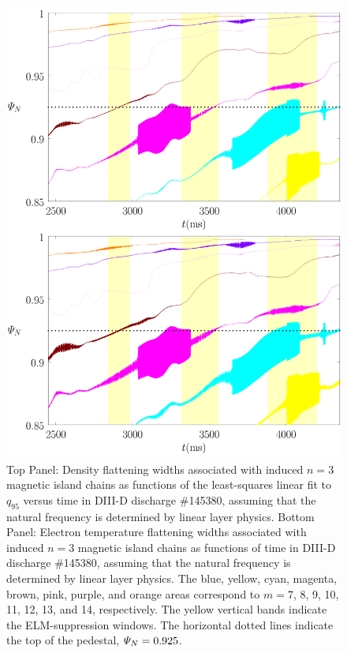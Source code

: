 \documentclass[12pt,prb,aps]{revtex4-1}
\begin{document}
\begin{figure}
\includegraphics[height=6in]{fig13.pdf}
\caption{Top Panel: Density flattening widths associated with induced $n=3$ magnetic island  chains as functions of the least-squares linear fit to $q_{95}$ versus time
in   DIII-D discharge \#145380, assuming that the natural frequency is determined by linear layer physics.
Bottom Panel:  Electron temperature flattening widths associated with induced $n=3$ magnetic island chains as functions of time
in   DIII-D discharge \#145380, assuming that the natural frequency is determined by linear layer physics. The blue, yellow, cyan, magenta, brown, pink,
purple, and orange  areas correspond to $m=7$, 8, 9, 10, 11, 12, 13, and 14, respectively. The yellow vertical bands indicate the ELM-suppression windows. 
The horizontal dotted lines indicate  the top of the pedestal, ${\mit\Psi}_N=0.925$.} \label{fig13}
\end{figure}
\end{document}
